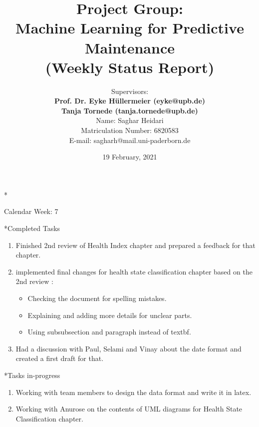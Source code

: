\documentclass[11pt,a4paper]{article}
\title{Project Group:\\
\textbf{Machine Learning for Predictive Maintenance}\\
(Weekly Status Report)}
\author{Supervisors:\\
\textbf{Prof. Dr. Eyke H{\"u}llermeier (eyke@upb.de)}\\
\textbf{Tanja Tornede (tanja.tornede@upb.de)}\\ 
\vspace{10mm}
Name: Saghar Heidari \\
Matriculation Number: 6820583\\
E-mail: sagharh@mail.uni-paderborn.de
}
\date{}
\begin{document}
\maketitle
\thispagestyle{empty}

\clearpage
{}
\newpage
\begin{section}*{Calendar Week: 7 \hfill \date{19 February, 2021}}
	
	\begin{subsection}*{Completed Tasks}
		\begin{enumerate}
                  \item Finished 2nd review of Health Index chapter and prepared a feedback for that chapter.
			\item implemented final changes for health state classification chapter based on the 2nd review : 
			\begin{itemize}
				\item Checking the document for spelling mistakes.
				\item Explaining and adding more details for unclear parts.
				\item Using subsubsection and paragraph instead of textbf.
			\end{itemize}
			\item Had a discussion with Paul, Selami and Vinay about the date format and created a first draft for that.
		\end{enumerate}
	\end{subsection}
	
	\begin{subsection}*{Tasks in-progress}
		\begin{enumerate}
			\item Working with team members to design the data format and write it in latex.
			\item Working with Anurose on the contents of UML diagrams for Health State Classification chapter.
		\end{enumerate}
	\end{subsection}
	
\end{section}
\newpage
\end{document}
